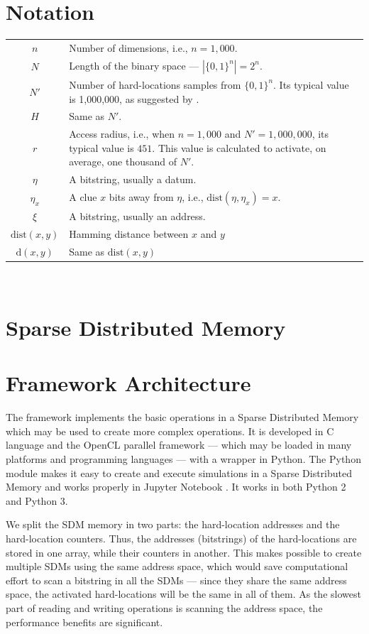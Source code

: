\chapter{Notation}

\begin{tabular}{cp{\textwidth}}
  $n$ & Number of dimensions, i.e., $n=1,000$. \\
  $N$ & Length of the binary space --- $|\{0, 1\}^n| = 2^n$. \\
  $N'$ & Number of hard-locations samples from $\{0, 1\}^n$. Its typical value is 1,000,000, as suggested by \citet{Kanerva1988}. \\
  $H$ & Same as $N'$. \\
  $r$ & Access radius, i.e., when $n=1,000$ and $N'=1,000,000$, its typical value is $451$. This value is calculated to activate, on average, one thousand of $N'$. \\
  $\eta$ & A bitstring, usually a datum. \\
  $\eta_x$ & A clue $x$ bits away from $\eta$, i.e., $\text{dist}(\eta, \eta_x) = x$. \\
  $\xi$ & A bitstring, usually an address. \\
  $\text{dist}(x, y)$ & Hamming distance between $x$ and $y$ \\
  $\text{d}(x, y)$ & Same as $\text{dist}(x, y)$
\end{tabular}\\

\chapter{Sparse Distributed Memory}




\chapter{Framework Architecture}

The framework implements the basic operations in a Sparse Distributed Memory which may be used to create more complex operations. It is developed in C language and the OpenCL parallel framework --- which may be loaded in many platforms and programming languages --- with a wrapper in Python. The Python module makes it easy to create and execute simulations in a Sparse Distributed Memory and works properly in Jupyter Notebook \citep{kluyver2016jupyter}. It works in both Python 2 and Python 3.

We split the SDM memory in two parts: the hard-location addresses and the hard-location counters. Thus, the addresses (bitstrings) of the hard-locations are stored in one array, while their counters in another. This makes possible to create multiple SDMs using the same address space, which would save computational effort to scan a bitstring in all the SDMs --- since they share the same address space, the activated hard-locations will be the same in all of them. As the slowest part of reading and writing operations is scanning the address space, the performance benefits are significant.

